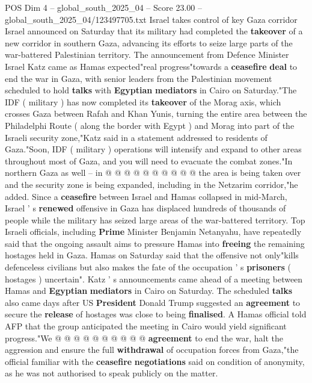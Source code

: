 \begin{textsample}{POS Dim 4 – global\_south\_2025\_04 – Score 23.00 – global\_south\_2025\_04/123497705.txt}  \label{ex:f4_pos_243}
Israel takes control of key Gaza corridor Israel announced on Saturday that its military had completed the \textbf{takeover} of a new corridor in southern Gaza, advancing its efforts to seize large parts of the war-battered Palestinian territory.
The announcement from Defence Minister Israel Katz came as Hamas expected"real progress"towards a \textbf{ceasefire} \textbf{deal} to end the war in Gaza, with senior leaders from the Palestinian movement scheduled to hold \textbf{talks} with \textbf{Egyptian} \textbf{mediators} in Cairo on Saturday."The IDF ( military ) has now completed its \textbf{takeover} of the Morag axis, which crosses Gaza between Rafah and Khan Yunis, turning the entire area between the Philadelphi Route ( along the border with Egypt ) and Morag into part of the Israeli security zone,"Katz said in a statement addressed to residents of Gaza."Soon, IDF ( military ) operations will intensify and expand to other areas throughout most of Gaza, and you will need to evacuate the combat zones."In northern Gaza as well -- in @ @ @ @ @ @ @ @ @ @ the area is being taken over and the security zone is being expanded, including in the Netzarim corridor,"he added.
Since a \textbf{ceasefire} between Israel and Hamas collapsed in mid-March, Israel ' s \textbf{renewed} offensive in Gaza has displaced hundreds of thousands of people while the military has seized large areas of the war-battered territory.
Top Israeli officials, including \textbf{Prime} Minister Benjamin Netanyahu, have repeatedly said that the ongoing assault aims to pressure Hamas into \textbf{freeing} the remaining hostages held in Gaza.
Hamas on Saturday said that the offensive not only"kills defenceless civilians but also makes the fate of the occupation ' s \textbf{prisoners} ( hostages ) uncertain".
Katz ' s announcements came ahead of a meeting between Hamas and \textbf{Egyptian} \textbf{mediators} in Cairo on Saturday.
The scheduled \textbf{talks} also came days after US \textbf{President} Donald Trump suggested an \textbf{agreement} to secure the \textbf{release} of hostages was close to being \textbf{finalised}.
A Hamas official told AFP that the group anticipated the meeting in Cairo would yield significant progress."We @ @ @ @ @ @ @ @ @ @ \textbf{agreement} to end the war, halt the aggression and ensure the full \textbf{withdrawal} of occupation forces from Gaza,"the official familiar with the \textbf{ceasefire} \textbf{negotiations} said on condition of anonymity, as he was not authorised to speak publicly on the matter.

\end{textsample}
